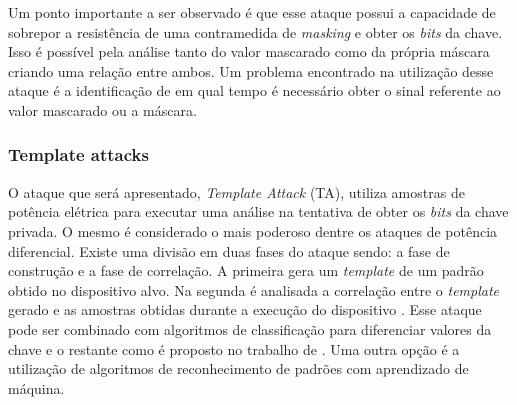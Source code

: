 Um ponto importante a ser observado é que esse ataque possui a capacidade de sobrepor a resistência de uma contramedida de \textit{masking} e obter os \textit{bits} da chave. Isso é possível pela análise tanto do valor mascarado como da própria máscara criando uma relação entre ambos. Um problema encontrado na utilização desse ataque é a identificação de em qual tempo é necessário obter o sinal referente ao valor mascarado ou a máscara.

\subsubsection{Template attacks}
O ataque que será apresentado, \textit{Template Attack} (TA), utiliza amostras de potência elétrica para executar uma análise na tentativa de obter os \textit{bits} da chave privada. O mesmo é considerado o mais poderoso dentre os ataques de potência diferencial. Existe uma divisão em duas fases do ataque sendo: a fase de construção e a fase de correlação. A primeira gera um \textit{template} de um padrão obtido no dispositivo alvo. Na segunda é analisada a correlação entre o \textit{template} gerado e as amostras obtidas durante a execução do dispositivo \cite{ozgen:2016}. Esse ataque pode ser combinado com algoritmos de classificação para diferenciar valores da chave e o restante como é proposto no trabalho de \cite{ozgen:2016}. Uma outra opção é a utilização de algoritmos de reconhecimento de padrões com aprendizado de máquina.
